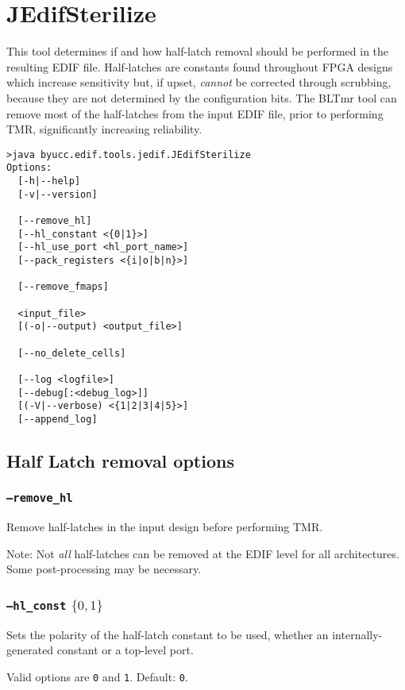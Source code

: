 \section{JEdifSterilize}
This tool determines if and how half-latch removal should be
performed in the resulting EDIF file. Half-latches are constants found
throughout FPGA designs which increase sensitivity but, if upset, \emph{cannot}
be corrected through scrubbing, because they are not determined by the
configuration bits. The BLTmr tool can remove most of the half-latches from the
input EDIF file, prior to performing TMR, significantly increasing reliability.

\begin{verbatim}
>java byucc.edif.tools.jedif.JEdifSterilize
Options:
  [-h|--help]
  [-v|--version]

  [--remove_hl]
  [--hl_constant <{0|1}>]
  [--hl_use_port <hl_port_name>]
  [--pack_registers <{i|o|b|n}>]

  [--remove_fmaps]

  <input_file>
  [(-o|--output) <output_file>]

  [--no_delete_cells]

  [--log <logfile>]
  [--debug[:<debug_log>]]
  [(-V|--verbose) <{1|2|3|4|5}>]
  [--append_log]

\end{verbatim}
\subsection{Half Latch removal options}

\subsubsection{\texttt{--remove\_hl}}
Remove half-latches in the input design before performing TMR.

Note: Not \emph{all} half-latches can be removed at the EDIF 
level for all architectures. Some post-processing may be necessary.

\subsubsection{\texttt{--hl\_const} $\{0,1\}$}
Sets the polarity of the half-latch constant to be used, whether an 
internally-generated constant or a top-level port. 

Valid options are \texttt{0} and \texttt{1}. Default: \texttt{0}.

